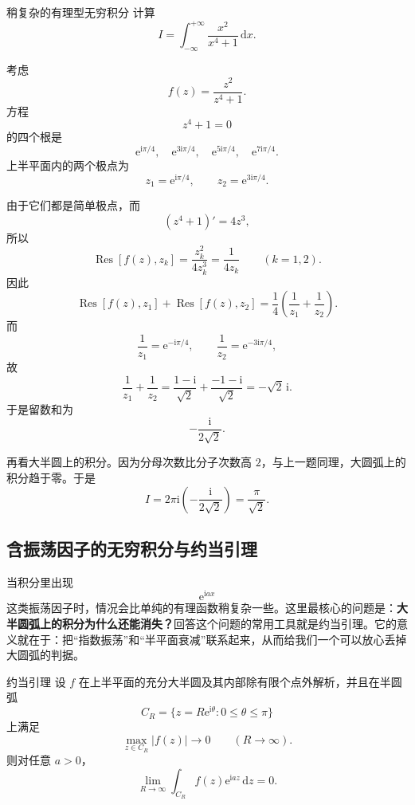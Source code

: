 \begin{lizi}{稍复杂的有理型无穷积分}{}
计算
\[
    I=\int_{-\infty}^{+\infty}\frac{x^2}{x^4+1}\,\mathrm{d}x.
\]

\begin{jie}
考虑
\[
    f(z)=\frac{z^2}{z^4+1}.
\]
方程
\[
    z^4+1=0
\]
的四个根是
\[
    \mathrm{e}^{\mathrm{i}\pi/4},\quad
    \mathrm{e}^{3\mathrm{i}\pi/4},\quad
    \mathrm{e}^{5\mathrm{i}\pi/4},\quad
    \mathrm{e}^{7\mathrm{i}\pi/4}.
\]
上半平面内的两个极点为
\[
    z_1=\mathrm{e}^{\mathrm{i}\pi/4},\qquad
    z_2=\mathrm{e}^{3\mathrm{i}\pi/4}.
\]

由于它们都是简单极点，而
\[
    (z^4+1)'=4z^3,
\]
所以
\[
    \operatorname{Res}[f(z),z_k]
    =
    \frac{z_k^2}{4z_k^3}
    =
    \frac{1}{4z_k}
    \qquad (k=1,2).
\]
因此
\[
    \operatorname{Res}[f(z),z_1]+\operatorname{Res}[f(z),z_2]
    =
    \frac{1}{4}\left(\frac{1}{z_1}+\frac{1}{z_2}\right).
\]
而
\[
    \frac{1}{z_1}=\mathrm{e}^{-\mathrm{i}\pi/4},\qquad
    \frac{1}{z_2}=\mathrm{e}^{-3\mathrm{i}\pi/4},
\]
故
\[
    \frac{1}{z_1}+\frac{1}{z_2}
    =
    \frac{1-\mathrm{i}}{\sqrt{2}}+\frac{-1-\mathrm{i}}{\sqrt{2}}
    =
    -\sqrt{2}\,\mathrm{i}.
\]
于是留数和为
\[
    -\frac{\mathrm{i}}{2\sqrt{2}}.
\]

再看大半圆上的积分。因为分母次数比分子次数高 $2$，与上一题同理，大圆弧上的积分趋于零。于是
\[
    I
    =
    2\pi \mathrm{i}\left(-\frac{\mathrm{i}}{2\sqrt{2}}\right)
    =
    \frac{\pi}{\sqrt{2}}.
\]
\end{jie}
\end{lizi}

\subsection{含振荡因子的无穷积分与约当引理}

当积分里出现
\[
    \mathrm{e}^{\mathrm{i}ax}
\]
这类振荡因子时，情况会比单纯的有理函数稍复杂一些。这里最核心的问题是：\textbf{大半圆弧上的积分为什么还能消失？}回答这个问题的常用工具就是约当引理。它的意义就在于：把``指数振荡''和``半平面衰减''联系起来，从而给我们一个可以放心丢掉大圆弧的判据。

\begin{dingli}{约当引理}{}
设 $f$ 在上半平面的充分大半圆及其内部除有限个点外解析，并且在半圆弧
\[
    C_R=\{z=R\mathrm{e}^{\mathrm{i}\theta}:0\le \theta\le \pi\}
\]
上满足
\[
    \max_{z\in C_R}|f(z)|\to 0
    \qquad (R\to\infty).
\]
则对任意 $a>0$，
\[
    \lim_{R\to\infty}\int_{C_R} f(z)\mathrm{e}^{\mathrm{i}az}\,\mathrm{d}z=0.
\]
\end{dingli}

